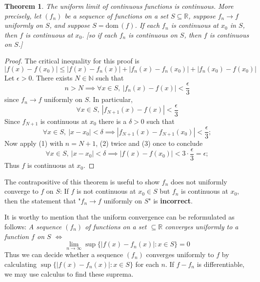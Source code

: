\documentclass[12pt, lettersize]{book}
\newtheorem{thm}{Theorem}[section]
\newcommand{\R}{\mathbb{R}}
\newcommand{\N}{\mathbb{N}}
\newcommand{\dom}{\text{dom}\,}
\begin{document}
			\setcounter{equation}{0}
			\begin{thm}\label{thm:24.3}
			The uniform limit of continuous functions is continuous. More precisely, let $(f_n)$ be a sequence of functions
			on a set $S\subseteq\R$, suppose $f_n\rightarrow f$ uniformly on $S$, and suppose $S=\dom(f)$. If each $f_n$ is
			continuous at $x_0$ in $S$, then $f$ is continuous at $x_0$. [so if each $f_n$ is continuous on $S$, then $f$ is continuous on $S$.]
			\end{thm}
			\begin{proof}
			The critical inequality for this proof is
			\begin{equation}
				|f(x)-f(x_0)|\leq|f(x)-f_n(x)|+|f_n(x)-f_n(x_0)|+|f_n(x_0)-f(x_0)|
			\end{equation}
			Let $\epsilon>0$. There exists $N\in\N$ such that
			\begin{displaymath}
				n>N\implies \forall x\in S,\ |f_n(x)-f(x)|<\frac{\epsilon}{3}
			\end{displaymath}
			since $f_n\rightarrow f$ uniformly on $S$. In particular,
			\begin{equation}
				\forall x\in S,\ |f_{N+1}(x)-f(x)|<\frac{\epsilon}{3}
			\end{equation}
			Since $f_{N+1}$ is continuous at $x_0$ there is a $\delta>0$ such that
			\begin{equation}
				\forall x\in S,\ |x-x_0|<\delta\implies|f_{N+1}(x)-f_{N+1}(x_0)|<\frac{\epsilon}{3};
			\end{equation}
			Now apply (1) with $n=N+1$, (2) twice and (3) once to conclude
			\begin{displaymath}
				\forall x\in S,\ |x-x_0|<\delta\implies|f(x)-f(x_0)|<3\cdot\frac{\epsilon}{3}=\epsilon;
			\end{displaymath}
		 	Thus $f$ is continuous at $x_0$.
			\end{proof}
			The contrapositive of this theorem is useful to show $f_n$ does not uniformly converge to $f$ on $S$:
			If $f$ is not continuous at $x_0\in S$ but $f_n$ is continuous at $x_0$, then the statement that "$f_n\rightarrow f$ uniformly on $S$" is \textbf{incorrect}.
		
			It is worthy to mention that the uniform convergence can be reformulated as follows: \emph{A sequence $(f_n)$ of functions on a set $\subseteq\R$ converges uniformly to a function $f$ on $S$ $\iff$}
			\begin{displaymath}
				\lim\limits_{n\rightarrow\infty}\sup\{|f(x)-f_n(x)|: x\in S\}=0
			\end{displaymath}
			Thus we can decide whether a sequence $(f_n)$ converges uniformly to $f$ by calculating $\sup\{|f(x)-f_n(x)|: x\in S\}$ for each $n$. If $f-f_n$ is differentiable, we may use calculus to find these suprema.
			\newpage
\end{document}
